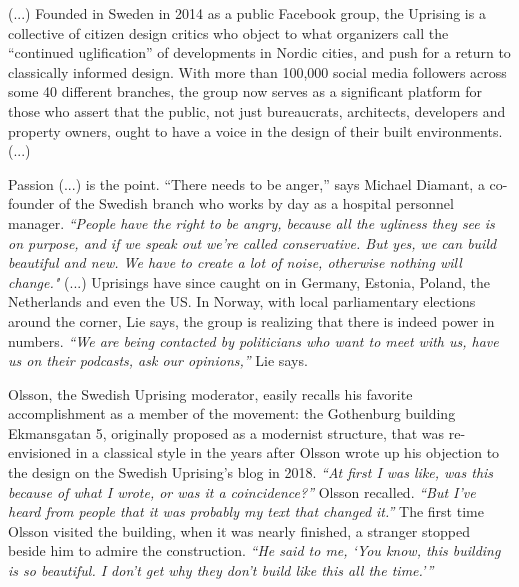 \documentclass[a4paper]{article}
\begin{document}
(...) Founded in Sweden in 2014 as a public Facebook group, the Uprising is a collective of citizen design critics who object to what organizers call the “continued uglification” of developments in Nordic cities, and push for a return to classically informed design. With more than 100,000 social media followers across some 40 different branches, the group now serves as a significant platform for those who assert that the public, not just bureaucrats, architects, developers and property owners, ought to have a voice in the design of their built environments. (...)

Passion (...) is the point. “There needs to be anger,” says Michael Diamant, a co-founder of the Swedish branch who works by day as a hospital personnel manager. \textit{“People have the right to be angry, because all the ugliness they see is on purpose, and if we speak out we’re called conservative. But yes, we can build beautiful and new. We have to create a lot of noise, otherwise nothing will change." }(...) Uprisings have since caught on in Germany, Estonia, Poland, the Netherlands and even the US. In Norway, with local parliamentary elections around the corner, Lie says, the group is realizing that there is indeed power in numbers. \textit{“We are being contacted by politicians who want to meet with us, have us on their podcasts, ask our opinions,”} Lie says.

Olsson, the Swedish Uprising moderator, easily recalls his favorite accomplishment as a member of the movement: the Gothenburg building Ekmansgatan 5, originally proposed as a modernist structure, that was re-envisioned in a classical style in the years after Olsson wrote up his objection to the design on the Swedish Uprising’s blog in 2018. \textit{“At first I was like, was this because of what I wrote, or was it a coincidence?”} Olsson recalled. \textit{“But I’ve heard from people that it was probably my text that changed it.”} The first time Olsson visited the building, when it was nearly finished, a stranger stopped beside him to admire the construction. \textit{“He said to me, ‘You know, this building is so beautiful. I don’t get why they don’t build like this all the time.’”}

\clearpage
\end{document}
